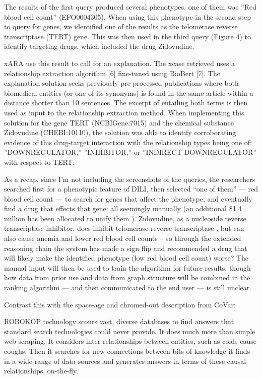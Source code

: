 \documentclass[10pt]{article}
\begin{document}
\begin{multicols}{2}
\begin{leftbar}
The results of the first query produced several phenotypes, one of them
was ''Red blood cell count'' (EFO0004305). When using this phenotype in
the second step to query for genes, we identified one of the results as
the telomerase reverse transcriptase (TERT) gene. This was then used in
the third query (Figure 4) to identify targeting drugs, which included
the drug Zidovudine.

xARA use this result to call for an explanation. The xcase retrieved
uses a relationship extraction algorithm {[}6{]} fine-tuned using
BioBert {[}7{]}. The explanation solution seeks previously pre-processed
publications where both biomedical entities (or one of its synonyms) is
found in the same article within a distance shorter than 10 sentences.
The excerpt of entailing both terms is then used as input to the
relationship extraction method. When implementing this solution for the
gene TERT (NCBIGene:7015) and the chemical substance Zidovudine
(CHEBI:10110), the solution was able to identify corroborating evidence
of this drug-target interaction with the relationship types being one
of: ''DOWNREGULATOR,'' ''INHIBITOR,'' or ''INDIRECT DOWNREGULATOR'' with
respect to TERT. \cite{goelExplanationContainerCaseBased2021} 
\end{leftbar}

As a recap, since I'm not including the screenshots of the queries, the
researchers searched first for a phenotypic feature of DILI, then
selected ``one of them'' --- red blood cell count --- to search for
genes that affect the phenotype, and eventually find a drug that effects
that gene: all seemingly manually (an additional \$1.4 million has been
allocated to unify them \cite{haendelCommonDialectInfrastructure2021} ). Zidovudine, as a nucleoside reverse transcriptase inhibitor, does
inhibit telomerase reverse transcriptase \cite{hukezalieVitroExVivo2012} , but can also cause anemia and lower red
blood cell counts \cite{ZidovudinePatientNIH}  -- so through the
extended reasoning chain the system has made a sign flip and recommended
a drug that will likely make the identified phenotype (low red blood
cell count) worse? The manual input will then be used to train the
algorithm for future results, though how data from prior use and data
from graph structure will be combined in the ranking algorithm --- and
then communicated to the end user --- is still unclear.

Contrast this with the space-age and chromed-out description from CoVar:

\begin{leftbar}
ROBOKOP technology scours vast, diverse databases to find answers that
standard search technologies could never provide. It does much more than
simple web-scraping. It considers inter-relationships between entities,
such as colds cause coughs. Then it searches for new connections between
bits of knowledge it finds in a wide range of data sources and generates
answers in terms of these causal relationships, on-the-fly.


\end{leftbar}
\end{multicols}
\end{document}
